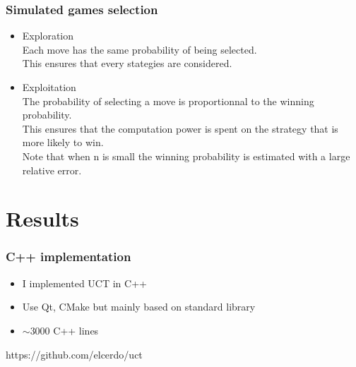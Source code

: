 \documentclass{beamer}
\begin{document}
\begin{frame}
\frametitle{Simulated games selection}
\begin{itemize}
 \item \alert{Exploration}
 \\ Each move has the same probability of being selected.
 \\ This ensures that every stategies are considered.
 \item \alert{Exploitation}
 \\ The probability of selecting a move is proportionnal to the winning probability.
 \\ This ensures that the computation power is spent on the strategy that is more likely to win.
 \\ Note that when n is small the winning probability is estimated with a large relative error.
\end{itemize}
\end{frame}

\section{Results}

\begin{frame}
\frametitle{C++ implementation}

\begin{itemize}
\item I implemented UCT in C++
\item Use Qt, CMake but mainly based on standard library
\item $\sim3000$ C++ lines
\end{itemize}
\begin{center}
\Huge \alert{https://github.com/elcerdo/uct}
\end{center}
\end{frame}
\end{document}
